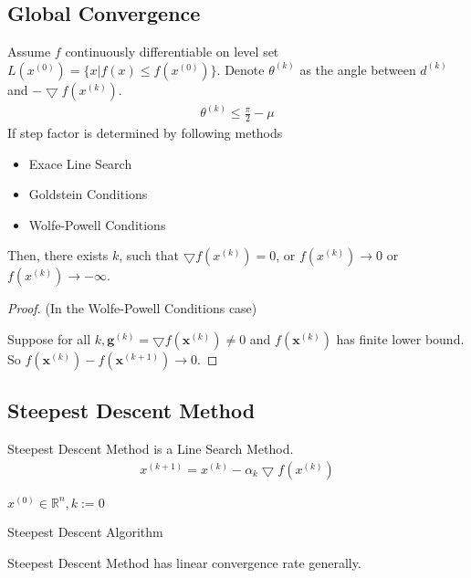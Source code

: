 \subsection{Global Convergence}
\begin{theorem}
    Assume $f$ continuously differentiable
    on level set $L(x^{(0)}) = \{ x | f(x) \leq f(x^{(0)})\}$.
    Denote $\theta^{(k)}$ as the angle between $d^{(k)}$
    and $-\bigtriangledown f(x^{(k)})$.
    \begin{align}
        \theta^{(k)} \leq \frac{\pi}{2} - \mu
    \end{align}
    If step factor is determined by following methods
    \begin{itemize}
        \item Exace Line Search
        \item Goldstein Conditions
        \item Wolfe-Powell Conditions
    \end{itemize}
    Then, there exists $k$, such that $\bigtriangledown f(x^{(k)}) = 0$,
    or $f(x^{(k)}) \rightarrow 0$ or $f(x^{(k)}) \rightarrow - \infty$.
\end{theorem}
\begin{proof}
    (In the Wolfe-Powell Conditions case)
    \par
    Suppose for all $k, \mathbf{g}^{(k)} = 
    \bigtriangledown f(\mathbf{x}^{(k)}) \neq 0$
    and $f(\mathbf{x}^{(k)})$ has finite lower bound.
    So $f(\mathbf{x}^{(k)}) - f(\mathbf{x}^{(k+1)})
    \rightarrow 0$.
\end{proof}

\subsection{Steepest Descent Method}
Steepest Descent Method is a Line Search Method.
\begin{align}
    x^{(k+1)} = x^{(k)} - \alpha_k \bigtriangledown f(x^{(k)})
\end{align}

\begin{algorithm}[H]
    \SetAlgoLined
     $x^{(0)} \in \mathbb{R}^n, k:= 0$\;
     \caption{Steepest Descent Algorithm}
\end{algorithm}
Steepest Descent Method has linear convergence rate generally.

